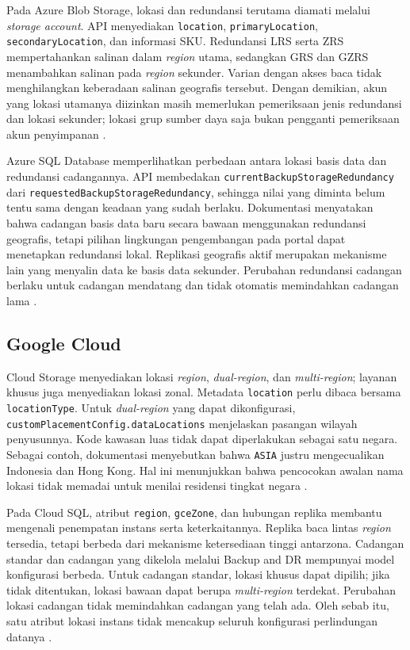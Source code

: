Pada Azure Blob Storage, lokasi dan redundansi terutama diamati melalui \textit{storage account}. API menyediakan \texttt{location}, \texttt{primaryLocation}, \texttt{secondaryLocation}, dan informasi SKU. Redundansi LRS serta ZRS mempertahankan salinan dalam \textit{region} utama, sedangkan GRS dan GZRS menambahkan salinan pada \textit{region} sekunder. Varian dengan akses baca tidak menghilangkan keberadaan salinan geografis tersebut. Dengan demikian, akun yang lokasi utamanya diizinkan masih memerlukan pemeriksaan jenis redundansi dan lokasi sekunder; lokasi grup sumber daya saja bukan pengganti pemeriksaan akun penyimpanan \autocite{b2c_azureStorageMetadata,b2c_azureStorageRedundancy}.

Azure SQL Database memperlihatkan perbedaan antara lokasi basis data dan redundansi cadangannya. API membedakan \texttt{currentBackup\allowbreak StorageRedundancy} dari \texttt{requestedBackup\allowbreak StorageRedundancy}, sehingga nilai yang diminta belum tentu sama dengan keadaan yang sudah berlaku. Dokumentasi menyatakan bahwa cadangan basis data baru secara bawaan menggunakan redundansi geografis, tetapi pilihan lingkungan pengembangan pada portal dapat menetapkan redundansi lokal. Replikasi geografis aktif merupakan mekanisme lain yang menyalin data ke basis data sekunder. Perubahan redundansi cadangan berlaku untuk cadangan mendatang dan tidak otomatis memindahkan cadangan lama \autocite{b2c_azureSqlMetadata,b2c_azureSqlBackup,b2c_azureSqlGeoReplication}.

\subsection{Google Cloud}

Cloud Storage menyediakan lokasi \textit{region}, \textit{dual-region}, dan \textit{multi-region}; layanan khusus juga menyediakan lokasi zonal. Metadata \texttt{location} perlu dibaca bersama \texttt{locationType}. Untuk \textit{dual-region} yang dapat dikonfigurasi, \texttt{customPlacementConfig.\allowbreak dataLocations} menjelaskan pasangan wilayah penyusunnya. Kode kawasan luas tidak dapat diperlakukan sebagai satu negara. Sebagai contoh, dokumentasi menyebutkan bahwa \texttt{ASIA} justru mengecualikan Indonesia dan Hong Kong. Hal ini menunjukkan bahwa pencocokan awalan nama lokasi tidak memadai untuk menilai residensi tingkat negara \autocite{b2c_gcpBucketLocations,b2c_gcpBucketMetadata}.

Pada Cloud SQL, atribut \texttt{region}, \texttt{gceZone}, dan hubungan replika membantu mengenali penempatan instans serta keterkaitannya. Replika baca lintas \textit{region} tersedia, tetapi berbeda dari mekanisme ketersediaan tinggi antarzona. Cadangan standar dan cadangan yang dikelola melalui Backup and DR mempunyai model konfigurasi berbeda. Untuk cadangan standar, lokasi khusus dapat dipilih; jika tidak ditentukan, lokasi bawaan dapat berupa \textit{multi-region} terdekat. Perubahan lokasi cadangan tidak memindahkan cadangan yang telah ada. Oleh sebab itu, satu atribut lokasi instans tidak mencakup seluruh konfigurasi perlindungan datanya \autocite{b2c_gcpSqlMetadata,b2c_gcpSqlCrossRegion,b2c_gcpSqlBackups}.

